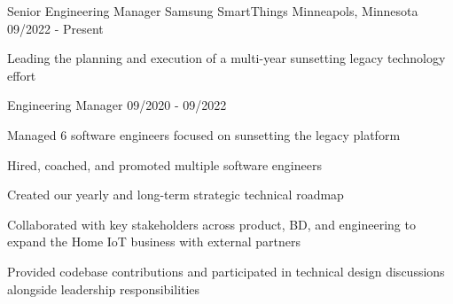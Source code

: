 

\begin{cventries}

  \cventry
    {Senior Engineering Manager} %
    {Samsung SmartThings} %
    {Minneapols, Minnesota} %
    {09/2022 - Present} %
    {
      \begin{cvitems} %
        \item {Leading the planning and execution of a multi-year sunsetting legacy technology effort}      
      \end{cvitems}
    }

  \cventry
    {Engineering Manager} %
    {} %
    {} %
    {09/2020 - 09/2022} %
    {
      \begin{cvitems} %
        \item {Managed 6 software engineers focused on sunsetting the legacy platform}
        \item {Hired, coached, and promoted multiple software engineers}
        \item {Created our yearly and long-term strategic technical roadmap}
        \item {Collaborated with key stakeholders across product, BD, and engineering to expand the Home IoT business with external partners}
        \item {Provided codebase contributions and participated in technical design discussions alongside leadership responsibilities}
      \end{cvitems}
    }


\end{cventries}
